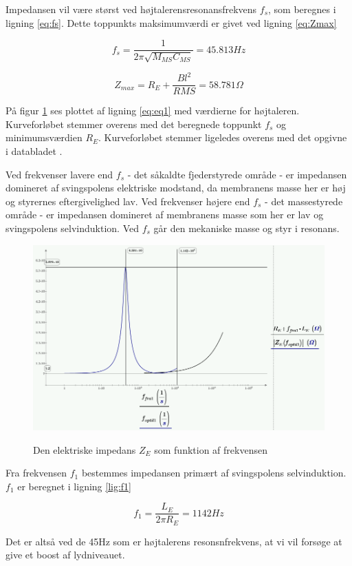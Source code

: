 Impedansen vil være størst ved højtalerensresonansfrekvens $f_s$, som beregnes i ligning \ref{eq:fs}. Dette toppunkts maksimumværdi er givet ved ligning \ref{eq:Zmax} 

\begin{equation}\label{eq:fs}
	f_s=\frac{1}{2 \pi \sqrt{M_{MS} C_{MS}}}=45.813Hz
\end{equation}

\begin{equation}\label{eq:Zmax}
	Z_{max}=R_E+\frac{Bl^2}{R{MS}}=58.781\Omega
\end{equation}

På figur \ref{fig:ZE_graf}  ses plottet af ligning \ref{eq:eq1} med værdierne for højtaleren. Kurveforløbet stemmer overens med det beregnede toppunkt $f_s$ og minimumsværdien $R_E$. Kurveforløbet stemmer ligeledes overens med det opgivne i databladet \citep{FW168}.

Ved frekvenser lavere end $f_s$ - det såkaldte fjederstyrede område - er impedansen domineret af svingspolens elektriske modstand, da membranens masse her er høj og styrernes eftergivelighed lav. Ved frekvenser højere end $f_s$ - det massestyrede område - er impedansen domineret af membranens masse som her er lav og svingspolens selvinduktion. Ved $f_s$ går den mekaniske masse og styr i resonans.


\begin{figure}[H]
	\centering
	\includegraphics[width=\textwidth]{Pics/ZE_graf.PNG}
	\label{fig:ZE_graf}
	\caption{Den elektriske impedans $Z_E$ som funktion af frekvensen} 
\end{figure}

Fra frekvensen $f_1$ bestemmes impedansen primært af svingspolens selvinduktion. $f_1$ er beregnet i ligning \ref{lig:f1}

\begin{equation}\label{lig:f1}
f_1=\frac{L_E}{2 \pi R_E}=1142Hz
\end{equation}

Det er altså ved de 45Hz som er højtalerens resonsnfrekvens, at vi vil forsøge at give et boost af lydniveauet.
